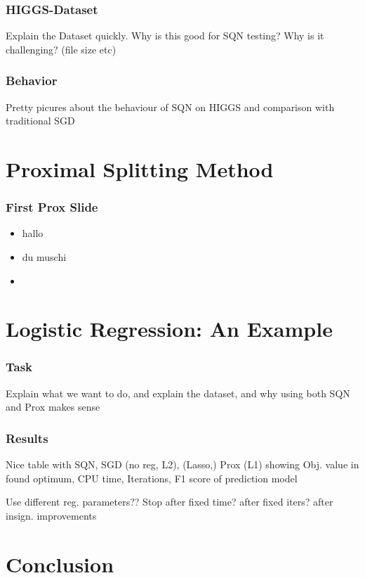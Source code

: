 \documentclass[10pt]{beamer}
\begin{document}
  \begin{frame}
    \frametitle{HIGGS-Dataset}
    Explain the Dataset quickly.
    Why is this good for SQN testing?
    Why is it challenging? (file size etc)
  \end{frame}

  \begin{frame}
    \frametitle{Behavior}
      Pretty picures about the behaviour of SQN on HIGGS
      and comparison with traditional SGD
  \end{frame}

 \section{Proximal Splitting Method}

   \begin{frame}\frametitle{First Prox Slide}
       \begin{itemize}
            \item hallo
            \item \alert{du muschi}
            \item \cite{becker2012quasi}
          \end{itemize}   
   
   \end{frame}

\section{Logistic Regression: An Example}
  \begin{frame}\frametitle{Task}
    Explain what we want to do, and explain the dataset,
    and why using both SQN and Prox makes sense   
  \end{frame}

  \begin{frame}\frametitle{Results}
    Nice table with SQN, SGD (no reg, L2), (Lasso,) Prox (L1) showing
    Obj. value in found optimum, CPU time, Iterations, F1 score of prediction model

    Use different reg. parameters??
    Stop after fixed time? after fixed iters? after insign. improvements  
  \end{frame}

\section{Conclusion}
\end{document}
